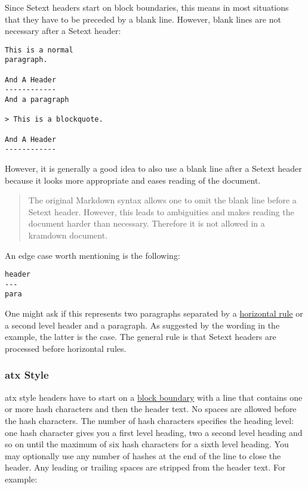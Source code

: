 \documentclass[a4paper]{article}
\begin{document}
Since Setext headers start on block boundaries, this means in most
situations that they have to be preceded by a blank line. However, blank
lines are not necessary after a Setext header:

\begin{verbatim}
This is a normal
paragraph.

And A Header
------------
And a paragraph

> This is a blockquote.

And A Header
------------
\end{verbatim}

However, it is generally a good idea to also use a blank line after a
Setext header because it looks more appropriate and eases reading of the
document.

\begin{quote}
The original Markdown syntax allows one to omit the blank line before a
Setext header. However, this leads to ambiguities and makes reading the
document harder than necessary. Therefore it is not allowed in a
kramdown document.
\end{quote}

An edge case worth mentioning is the following:

\begin{verbatim}
header
---
para
\end{verbatim}

One might ask if this represents two paragraphs separated by a
\protect\hyperlink{horizontal-rules}{horizontal rule} or a second level
header and a paragraph. As suggested by the wording in the example, the
latter is the case. The general rule is that Setext headers are
processed before horizontal rules.

\hypertarget{atx-style}{\subsubsection{atx Style}\label{atx-style}}

atx style headers have to start on a
\protect\hyperlink{block-boundaries}{block boundary} with a line that
contains one or more hash characters and then the header text. No spaces
are allowed before the hash characters. The number of hash characters
specifies the heading level: one hash character gives you a first level
heading, two a second level heading and so on until the maximum of six
hash characters for a sixth level heading. You may optionally use any
number of hashes at the end of the line to close the header. Any leading
or trailing spaces are stripped from the header text. For example:
\end{document}
